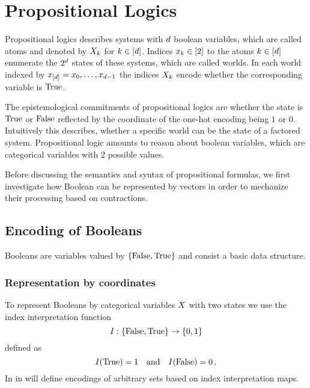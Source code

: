 \section{Propositional Logics}\label{cha:logicalRepresentation}

Propositional logics describes systems with $d$ boolean variables, which are called atoms and denoted by $X_{k}$ for $k\in[d]$.
Indices $x_{k}\in[2]$ to the atoms $k\in[d]$ enumerate the $2^d$ states of these systems, which are called worlds.
In each world indexed by $x_{[d]}=x_{0},\ldots,x_{d-1}$ the indices $X_{k}$ encode whether the corresponding variable is $\mathrm{True}$. 

The epistemological commitments of propositional logics are whether the state is $\mathrm{True}$ or $\mathrm{False}$ reflected by the coordinate of the one-hot encoding being $1$ or $0$.
Intuitively this describes, whether a specific world can be the state of a factored system.
Propositional logic amounts to reason about boolean variables, which are categorical variables with $2$ possible values.


Before discussing the semantics and syntax of propositional formulas, we first investigate how Boolean can be represented by vectors in order to mechanize their processing based on contractions.

\subsection{Encoding of Booleans}

Booleans are variables valued by $\{\mathrm{False},\mathrm{True}\}$ and consist a basic data structure.

\subsubsection{Representation by coordinates}

To represent Booleans by categorical variables $X$ with two states we use the index interpretation function
	\[ I:\{\mathrm{False},\mathrm{True}\}\rightarrow\{0,1\} \]
defined as
    	\[ I(\mathrm{True}) = 1 \quad \text{and} \quad I(\mathrm{False}) = 0 \, . \]
In  in  will define encodings of arbitrary sets based on index interpretation maps.

